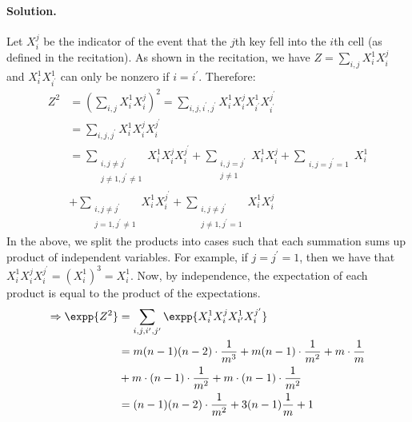 \begin{enumerate}
  \paragraph{Solution.} Let $X_{i}^{j}$ be the indicator of the event that the $j$th key fell into the $i$th cell (as defined in the recitation). As shown in the recitation, we have $Z = \sum_{i,j}{X_{i}^{1}X_{i}^{j}}$ and $X^{1}_{i}X^{1}_{i^{\prime}}$ can only be nonzero if $i=i^{\prime}$. Therefore:
  \begin{equation*}
    \begin{split}
      Z^{2} &=  \left(\sum_{i,j}{X_{i}^{1}X_{i}^{j}}\right)^{2} = \sum_{i,j,i^{\prime},j^{\prime}}{X_{i}^{1}X_{i}^{j}X_{i^{\prime}}^{1}X_{i^{\prime}}^{j^{\prime}}}\\
      &= \sum_{i,j,j^{\prime}}{X_{i}^{1}X_{i}^{j}X_{i}^{j^{\prime}}}\\
      &= \sum_{ \substack{ i,j \neq j^{\prime} \\ j \neq 1, j^{\prime}\neq 1 }}{X_{i}^{1}X_{i}^{j}X_{i}^{j^{\prime}}}  + \sum_{ \substack{ i,j = j^{\prime} \\ j \neq 1 }}{X_{i}^{1}X_{i}^{j}} + \sum_{ \substack{ i,j = j^{\prime} = 1 }}{X_{i}^{1}} \\  
 & + \sum_{ \substack{ i,j \neq j^{\prime} \\ j = 1, j^{\prime}\neq 1 }}{X_{i}^{1}X_{i}^{j^{\prime}}}  + \sum_{ \substack{ i,j \neq j^{\prime} \\ j \neq 1, j^{\prime} = 1 }}{X_{i}^{1}X_{i}^{j}}  
 \end{split}
 \end{equation*}
 In the above, we split the products into cases such that each summation sums up product of independent variables. For example, if $j=j^{\prime}=1$, then we have that $X_{i}^{1}X_{i}^{j}X_{i}^{j^{\prime}} = \left( X_{i}^{1}\right)^{3} = X_{i}^{1}$. Now, by independence, the expectation of each product is equal to the product of the expectations.
\begin{equation*}
\begin{split}
      \Rightarrow \expp{Z^2} &= \sum_{i,j,i^{\prime},j^{\prime}}{\expp{X_{i}^{1}X_{i}^{j}X_{i^{\prime}}^{1}X_{i}^{j^{\prime}}}} \\
      &= m (n-1)(n-2) \cdot \frac{1}{m^{3}} + m(n-1) \cdot \frac{1}{m^{2}} + m \cdot \frac{1}{m} \\  
      &+ m \cdot (n-1) \cdot \frac{1}{m^{2}} + m \cdot (n-1) \cdot \frac{1}{m^{2}} \\
      &= (n-1)(n-2) \cdot \frac{1}{m^{2}} + 3 (n-1) \frac{1}{m} + 1 
    \end{split}
  \end{equation*}
\fi
\ifdefined\CHECK

\end{enumerate}
